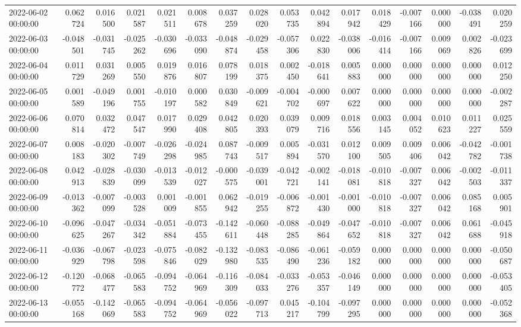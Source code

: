 \begin{tabular}{lrrrrrrrrrrrrrrr}
2022-06-02 00:00:00 & 0.062724 & 0.016500 & 0.021587 & 0.021511 & 0.008678 & 0.037259 & 0.028020 & 0.053735 & 0.042894 & 0.017942 & 0.018429 & -0.007166 & 0.000000 & -0.038491 & 0.020259 \\
2022-06-03 00:00:00 & -0.048501 & -0.031745 & -0.025262 & -0.030696 & -0.033090 & -0.048874 & -0.029458 & -0.057306 & 0.022830 & -0.038006 & -0.016414 & -0.007166 & 0.009069 & 0.002826 & -0.023699 \\
2022-06-04 00:00:00 & 0.011729 & 0.031269 & 0.005550 & 0.019876 & 0.016807 & 0.078199 & 0.018375 & 0.002450 & -0.018641 & 0.005883 & 0.000000 & 0.000000 & 0.000000 & 0.000000 & 0.012250 \\
2022-06-05 00:00:00 & 0.001589 & -0.049196 & 0.001755 & -0.010197 & 0.000582 & 0.030849 & -0.009621 & -0.004702 & -0.000697 & 0.007622 & 0.000000 & 0.000000 & 0.000000 & 0.000000 & -0.002287 \\
2022-06-06 00:00:00 & 0.070814 & 0.032472 & 0.047547 & 0.017990 & 0.029408 & 0.042805 & 0.020393 & 0.039079 & 0.009716 & 0.018556 & 0.003145 & 0.004052 & 0.010623 & 0.011227 & 0.025559 \\
2022-06-07 00:00:00 & 0.008183 & -0.020302 & -0.007749 & -0.026298 & -0.024985 & 0.087743 & -0.009517 & 0.005894 & -0.031570 & 0.012100 & 0.009505 & 0.009406 & 0.006042 & -0.042782 & -0.001738 \\
2022-06-08 00:00:00 & 0.042913 & -0.028839 & -0.030099 & -0.013539 & -0.012027 & -0.000575 & -0.039001 & -0.042721 & -0.002141 & -0.018081 & -0.010818 & -0.007327 & 0.006042 & -0.002503 & -0.011337 \\
2022-06-09 00:00:00 & -0.013362 & -0.007099 & -0.003528 & 0.001009 & -0.001855 & 0.062942 & -0.019255 & -0.006872 & -0.001430 & -0.001000 & -0.010818 & -0.007327 & 0.006042 & 0.085168 & 0.005901 \\
2022-06-10 00:00:00 & -0.096625 & -0.047267 & -0.034342 & -0.051884 & -0.073455 & -0.142611 & -0.060448 & -0.088285 & -0.049864 & -0.047652 & -0.010818 & -0.007327 & 0.006042 & 0.061688 & -0.045918 \\
2022-06-11 00:00:00 & -0.036929 & -0.067798 & -0.023598 & -0.075846 & -0.082029 & -0.132980 & -0.083535 & -0.086490 & -0.061236 & -0.059182 & 0.000000 & 0.000000 & 0.000000 & 0.000000 & -0.050687 \\
2022-06-12 00:00:00 & -0.120772 & -0.068477 & -0.065583 & -0.094752 & -0.064969 & -0.116309 & -0.084033 & -0.033276 & -0.053357 & -0.046149 & 0.000000 & 0.000000 & 0.000000 & 0.000000 & -0.053405 \\
2022-06-13 00:00:00 & -0.055168 & -0.142069 & -0.065583 & -0.094752 & -0.064969 & -0.056022 & -0.097713 & 0.045217 & -0.104799 & -0.097295 & 0.000000 & 0.000000 & 0.000000 & 0.000000 & -0.052368 \\

\end{tabular}
